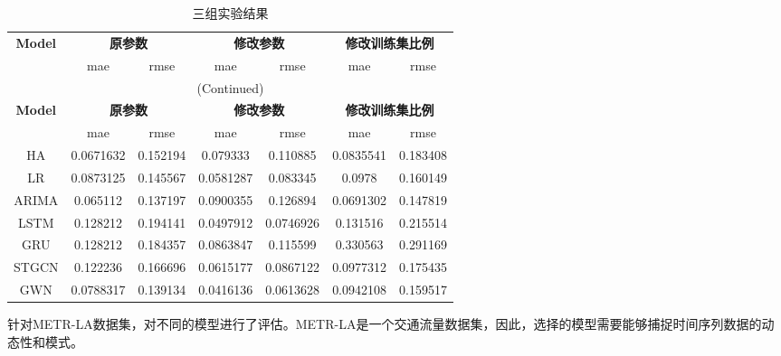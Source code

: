 \documentclass[4pt]{article}
\begin{document}
\setlength{\LTleft}{2cm}  %
\large      %
\begin{longtable}{ccccccc} %
\caption{三组实验结果} \\
\toprule
\textbf{Model} & \multicolumn{2}{c}{\textbf{原参数}} & \multicolumn{2}{c}{\textbf{修改参数}} & \multicolumn{2}{c}{\textbf{修改训练集比例}} \\
\cmidrule(r){2-3} \cmidrule(r){4-5} \cmidrule(r){6-7}
& mae & rmse & mae & rmse & mae & rmse \\
\midrule
\endfirsthead
\multicolumn{7}{c}{(Continued)} \\
\midrule
\textbf{Model} & \multicolumn{2}{c}{\textbf{原参数}} & \multicolumn{2}{c}{\textbf{修改参数}} & \multicolumn{2}{c}{\textbf{修改训练集比例}} \\
\cmidrule(r){2-3} \cmidrule(r){4-5} \cmidrule(r){6-7}
& mae & rmse & mae & rmse & mae & rmse \\
\midrule
\endhead
\bottomrule
\endlastfoot
HA & 0.0671632 & 0.152194 & 0.079333 & 0.110885 & 0.0835541 & 0.183408 \\
LR & 0.0873125 & 0.145567 & 0.0581287 & 0.083345 & 0.0978 & 0.160149 \\
ARIMA & 0.065112 & 0.137197 & 0.0900355 & 0.126894 & 0.0691302 & 0.147819 \\
LSTM & 0.128212 & 0.194141 & 0.0497912 & 0.0746926 & 0.131516 & 0.215514 \\
GRU & 0.128212 & 0.184357 & 0.0863847 & 0.115599 & 0.330563 & 0.291169 \\
STGCN & 0.122236 & 0.166696 & 0.0615177 & 0.0867122 & 0.0977312 & 0.175435 \\
GWN & 0.0788317 & 0.139134 & 0.0416136 & 0.0613628 & 0.0942108 & 0.159517 \\
\end{longtable}


针对METR-LA数据集，对不同的模型进行了评估。METR-LA是一个交通流量数据集，因此，选择的模型需要能够捕捉时间序列数据的动态性和模式。
\end{document}
